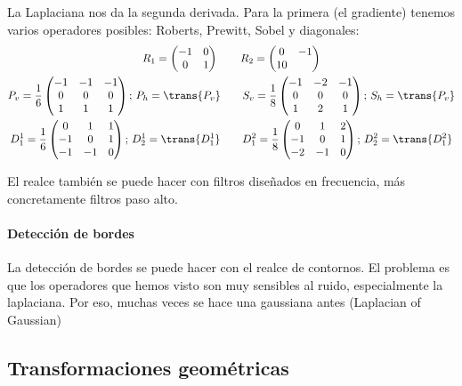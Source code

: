 \documentclass[nochap,palatino,notitlepage]{apuntes}
\begin{document}
La Laplaciana nos da la segunda derivada. Para la primera (el gradiente) tenemos varios operadores posibles: Roberts, Prewitt, Sobel y diagonales:
\begin{gather*}
R_1 = \begin{pmatrix} - 1 & 0 \\ 0 & 1 \end{pmatrix} \qquad R_2 = \begin{pmatrix}0 & -1 \\ 1 0 \end{pmatrix} \\
P_v = \frac{1}{6} \begin{pmatrix} -1 & -1 & -1 \\ 0 & 0 & 0 \\ 1 & 1 & 1 \end{pmatrix};\,P_h = \trans{P_v}
\qquad
S_v = \frac{1}{8} \begin{pmatrix} -1 & -2 & -1 \\ 0 & 0 & 0 \\ 1 & 2 & 1 \end{pmatrix};\,S_h = \trans{P_v} \\
D^1_1 = \frac{1}{6} \begin{pmatrix} 0 & 1 & 1 \\ -1 & 0 & 1 \\ -1 & -1 & 0 \end{pmatrix};\,D^1_2 = \trans{D^1_1} \qquad
D^2_1 = \frac{1}{8} \begin{pmatrix} 0 & 1 & 2 \\ -1 & 0 & 1 \\ -2 & -1 & 0 \end{pmatrix};\,D^2_2 = \trans{D^2_1}
\end{gather*}

El realce también se puede hacer con filtros diseñados en frecuencia, más concretamente filtros paso alto.

\paragraph{Detección de bordes} La detección de bordes se puede hacer con el realce de contornos. El problema es que los operadores que hemos visto son muy sensibles al ruido, especialmente la laplaciana. Por eso, muchas veces se hace una gaussiana antes (Laplacian of Gaussian)

\subsection{Transformaciones geométricas}
\end{document}
